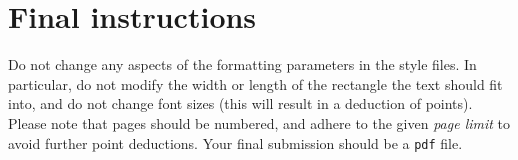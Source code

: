 \section{Final instructions}

Do not change any aspects of the formatting parameters in the style files. In
particular, do not modify the width or length of the rectangle the text should
fit into, and do not change font sizes (this will result in a deduction of points). 
Please note that pages should be numbered, and adhere to the given \emph{page limit} to avoid further point deductions. Your final submission should be a \texttt{pdf} file.

\newpage
